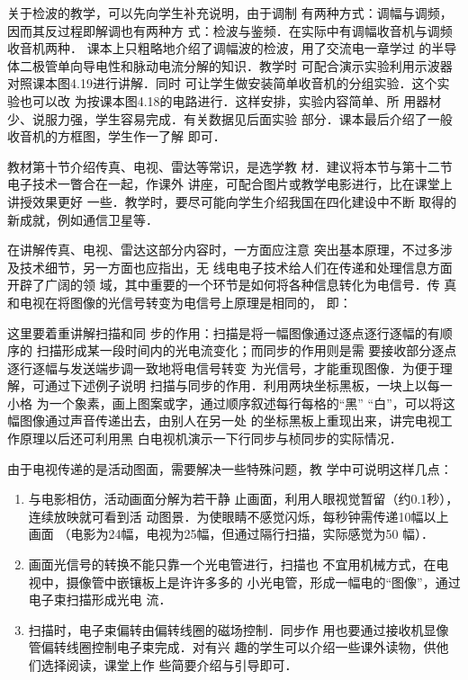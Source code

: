 关于检波的教学，可以先向学生补充说明，由于调制
有两种方式：调幅与调频，因而其反过程即解调也有两种方
式：检波与鉴频．在实际中有调幅收音机与调频收音机两种．
课本上只粗略地介绍了调幅波的检波，用了交流电一章学过
的半导体二极管单向导电性和脉动电流分解的知识．教学时
可配合演示实验利用示波器对照课本图4.19进行讲解．同时
可让学生做安装简单收音机的分组实验．这个实验也可以改
为按课本图4.18的电路进行．这样安排，实验内容简单、所
用器材少、说服力强，学生容易完成．有关数据见后面实验
部分．课本最后介绍了一般收音机的方框图，学生作一了解
即可．

教材第十节介绍传真、电视、雷达等常识，是选学教
材．建议将本节与第十二节电子技术一瞥合在一起，作课外
讲座，可配合图片或教学电影进行，比在课堂上讲授效果更好
一些．教学时，要尽可能向学生介绍我国在四化建设中不断
取得的新成就，例如通信卫星等．

在讲解传真、电视、雷达这部分内容时，一方面应注意
突出基本原理，不过多涉及技术细节，另一方面也应指出，无
线电电子技术给人们在传递和处理信息方面开辟了广阔的领
域，其中重要的一个环节是如何将各种信息转化为电信号．传
真和电视在将图像的光信号转变为电信号上原理是相同的，
即：
\begin{center}
    \end{center}
这里要着重讲解扫描和同
步的作用：扫描是将一幅图像通过逐点逐行逐幅的有顺序的
扫描形成某一段时间内的光电流变化；而同步的作用则是需
要接收部分逐点逐行逐幅与发送端步调一致地将电信号转变
为光信号，才能重现图像．为便于理解，可通过下述例子说明
扫描与同步的作用．利用两块坐标黑板，一块上以每一小格
为一个象素，画上图案或字，通过顺序叙述每行每格的“黑”
“白”，可以将这幅图像通过声音传递出去，由别人在另一处
的坐标黑板上重现出来，讲完电视工作原理以后还可利用黑
白电视机演示一下行同步与桢同步的实际情况．

由于电视传递的是活动图面，需要解决一些特殊问题，教
学中可说明这样几点：
\begin{enumerate}
\item 与电影相仿，活动画面分解为若干静
止画面，利用人眼视觉暂留（约0.1秒），连续放映就可看到活
动图景．为使眼睛不感觉闪烁，每秒钟需传递10幅以上画面
（电影为24幅，电视为25幅，但通过隔行扫描，实际感觉为50
幅）．
\item 画面光信号的转换不能只靠一个光电管进行，扫描也
不宜用机械方式，在电视中，摄像管中嵌镶板上是许许多多的
小光电管，形成一幅电的“图像”，通过电子束扫描形成光电
流．
\item 扫描时，电子束偏转由偏转线圈的磁场控制．同步作
用也要通过接收机显像管偏转线圈控制电子束完成．对有兴
趣的学生可以介绍一些课外读物，供他们选择阅读，课堂上作
些简要介绍与引导即可．
\end{enumerate}



